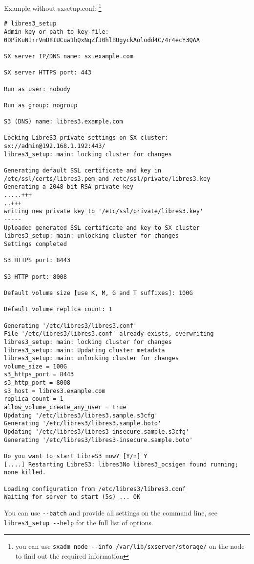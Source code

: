 Example without sxsetup.conf:
\footnote{you can use \texttt{sxadm node -{}-info /var/lib/sxserver/storage/} on the \SX node to find out the required information}

\begin{lstlisting}
# libres3_setup
Admin key or path to key-file: 0DPiKuNIrrVmD8IUCuw1hQxNqZfJ0hlBUgyckAolodd4C/4r4ecY3QAA

SX server IP/DNS name: sx.example.com

SX server HTTPS port: 443

Run as user: nobody

Run as group: nogroup

S3 (DNS) name: libres3.example.com

Locking LibreS3 private settings on SX cluster: sx://admin@192.168.1.192:443/
libres3_setup: main: locking cluster for changes

Generating default SSL certificate and key in /etc/ssl/certs/libres3.pem and /etc/ssl/private/libres3.key
Generating a 2048 bit RSA private key
.....+++
..+++
writing new private key to '/etc/ssl/private/libres3.key'
-----
Uploaded generated SSL certificate and key to SX cluster
libres3_setup: main: unlocking cluster for changes
Settings completed

S3 HTTPS port: 8443

S3 HTTP port: 8008

Default volume size [use K, M, G and T suffixes]: 100G

Default volume replica count: 1

Generating '/etc/libres3/libres3.conf'
File '/etc/libres3/libres3.conf' already exists, overwriting
libres3_setup: main: locking cluster for changes
libres3_setup: main: Updating cluster metadata
libres3_setup: main: unlocking cluster for changes
volume_size = 100G
s3_https_port = 8443
s3_http_port = 8008
s3_host = libres3.example.com
replica_count = 1
allow_volume_create_any_user = true
Updating '/etc/libres3/libres3.sample.s3cfg'
Generating '/etc/libres3/libres3.sample.boto'
Updating '/etc/libres3/libres3-insecure.sample.s3cfg'
Generating '/etc/libres3/libres3-insecure.sample.boto'

Do you want to start LibreS3 now? [Y/n] Y
[....] Restarting LibreS3: libres3No libres3_ocsigen found running; none killed.

Loading configuration from /etc/libres3/libres3.conf
Waiting for server to start (5s) ... OK
\end{lstlisting}

You can use \verb|--batch| and provide all settings on the command line, see
\verb|libres3_setup --help| for the full list of options.

